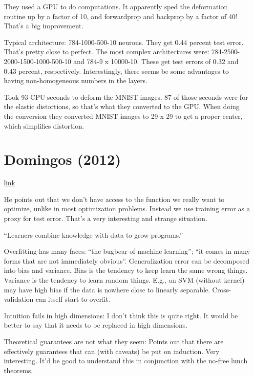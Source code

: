 \documentclass[12pt]{report}
\newcommand{\link}[2]{\href{#1}{#2}}
\begin{document}
They used a GPU to do computations.  It apparently sped the
deformation routine up by a factor of 10, and forwardprop and backprop
by a factor of 40!  That's a big improvement.

Typical architecture: 784-1000-500-10 neurons.  They get 0.44 percent
test error.  That's pretty close to perfect.  The most complex
architectures were: 784-2500-2000-1500-1000-500-10 and 784-9 x
10000-10.  These get test errors of 0.32 and 0.43 percent,
respectively.  Interestingly, there seems be some advantages to having
non-homogeneous numbers in the layers.

Took 93 CPU seconds to deform the MNIST images.  87 of those seconds
were for the elastic distortions, so that's what they converted to the
GPU.  When doing the conversion they converted MNIST images to 29 x 29
to get a proper center, which simplifies distortion.

\section{Domingos (2012)} 

\link{http://scholar.google.ca/scholar?cluster=4404716649035182981\&hl=en\&as\_sdt=0,5}{link}

He points out that we don't have access to the function we really want
to optimize, unlike in most optimization problems.  Instead we use
training error as a proxy for test error.  That's a very interesting
and strange situation.

``Learners combine knowledge with data to grow programs.''

Overfitting has many faces: ``the bugbear of machine learning''; ``it
comes in many forms that are not immediately obvious''.
Generalization error can be decomposed into bias and variance.  Bias
is the tendency to keep learn the same wrong things.  Variance is the
tendency to learn random things.  E.g., an SVM (without kernel) may
have high bias if the data is nowhere close to linearly separable.
Cross-validation can itself start to overfit.

Intuition fails in high dimensions: I don't think this is quite right.
It would be better to say that it needs to be replaced in high
dimensions.

Theoretical guarantees are not what they seem: Points out that there
are effectively guarantees that can (with caveats) be put on
induction.  Very interesting.  It'd be good to understand this in
conjunction with the no-free lunch theorems.
\end{document}
